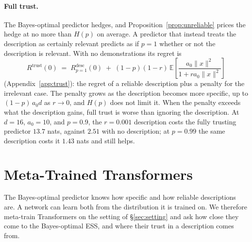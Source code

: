 \documentclass{article}
\newcommand{\E}{\mathbb{E}}
\begin{document}
\paragraph{Full trust.} The Bayes-optimal predictor hedges, and Proposition~\ref{prop:unreliable} prices the hedge at no more than $H(p)$ on average. A predictor that instead treats the description as certainly relevant predicts as if $p = 1$ whether or not the description is relevant. With no demonstrations its regret is
\begin{equation}\label{eq:trust}
    R^{\mathrm{trust}}(0) \;=\; R^{\mathrm{desc}}_{p=1}(0) \;+\; (1-p)(1-r)\,\E\!\left[\frac{a_0\|x\|^2}{1 + r a_0 \|x\|^2}\right]
\end{equation}
(Appendix~\ref{app:trust}): the regret of a reliable description plus a penalty for the irrelevant case. The penalty grows as the description becomes more specific, up to $(1-p)\,a_0 d$ as $r \to 0$, and $H(p)$ does not limit it. When the penalty exceeds what the description gains, full trust is worse than ignoring the description. At $d = 16$, $a_0 = 10$, and $p = 0.9$, the $r = 0.001$ description costs the fully trusting predictor $13.7$ nats, against $2.51$ with no description; at $p = 0.99$ the same description costs it $1.43$ nats and still helps.

\section{Meta-Trained Transformers}\label{sec:networks}
The Bayes-optimal predictor knows how specific and how reliable descriptions are. A network can learn both from the distribution it is trained on. We therefore meta-train Transformers on the setting of \S\ref{sec:setting} and ask how close they come to the Bayes-optimal ESS, and where their trust in a description comes from.
\end{document}
